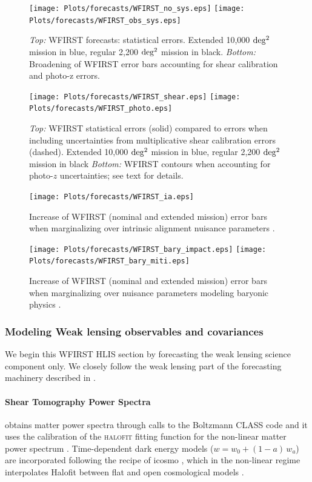 \begin{figure}
\texttt{[image: Plots/forecasts/WFIRST\_no\_sys.eps]}
\texttt{[image: Plots/forecasts/WFIRST\_obs\_sys.eps]}
\caption{\textit{Top:} WFIRST forecasts: statistical errors. Extended 10,000 $\mathrm{deg^2}$ mission in blue, regular 2,200 $\mathrm{deg^2}$ mission in black. \textit{Bottom:} Broadening of WFIRST error bars accounting for shear calibration and photo-z errors.}
         \label{fi:extended}
\end{figure}

\begin{figure}
\texttt{[image: Plots/forecasts/WFIRST\_shear.eps]}
\texttt{[image: Plots/forecasts/WFIRST\_photo.eps]}
\caption{\textit{Top:} WFIRST statistical errors (solid) compared to errors when including uncertainties from multiplicative shear calibration errors (dashed).  Extended 10,000 $\mathrm{deg^2}$ mission in blue, regular 2,200 $\mathrm{deg^2}$ mission in black
\textit{Bottom:} WFIRST contours when accounting for photo-$z$ uncertainties; see text for details.}
         \label{fi:sys_obs}
\end{figure}

\begin{figure}
\texttt{[image: Plots/forecasts/WFIRST\_ia.eps]}
\caption{Increase of WFIRST (nominal and extended mission) error bars when marginalizing over intrinsic alignment nuisance parameters \citep[see][for comparison]{Krause2016}.} \label{fi:IA}
\end{figure}

\begin{figure}
\texttt{[image: Plots/forecasts/WFIRST\_bary\_impact.eps]}
\texttt{[image: Plots/forecasts/WFIRST\_bary\_miti.eps]}
\caption{Increase of WFIRST (nominal and extended mission) error bars when marginalizing over nuisance parameters modeling baryonic physics \citep[see][for details of the method]{Eifler2015}.}
         \label{fi:bary}
\end{figure}

\subsubsection{Modeling Weak lensing observables and covariances}
\label{sec:lensingbasics}

We begin this WFIRST HLIS section by forecasting the weak lensing science component only. We closely follow the weak lensing part of the forecasting machinery described in \cite{Krause2017}.

\paragraph{Shear Tomography Power Spectra} \CoLi obtains matter power spectra through calls to the Boltzmann \textsc{CLASS} code and it uses the \citet{tsn12} calibration of the \textsc{halofit} fitting function for the non-linear matter power spectrum \citep{smp03}. Time-dependent dark energy models ($w=w_0+(1-a)\,w_a$) are incorporated following the recipe of {\sc icosmo} \citep{rak11}, which in the non-linear regime interpolates Halofit between flat and open cosmological models \citep[also see][for more details]{shj10}.

